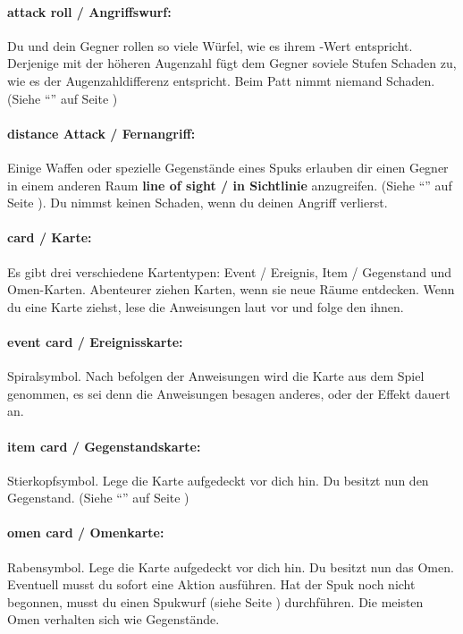 \paragraph{attack roll / Angriffswurf:} Du und dein Gegner rollen so viele Würfel, wie es ihrem \might-Wert entspricht. Derjenige mit der höheren Augenzahl fügt dem Gegner soviele Stufen Schaden zu, wie es der Augenzahldifferenz entspricht. Beim Patt nimmt niemand Schaden. (Siehe ``'' auf Seite \pageref{kap:rule:attack})

\paragraph{distance Attack / Fernangriff:} Einige Waffen oder spezielle Gegenstände eines Spuks erlauben dir einen Gegner in einem anderen Raum \textbf{line of sight / in Sichtlinie} anzugreifen. (Siehe ``'' auf Seite \pageref{kap:rule:specialattack}). Du nimmst keinen Schaden, wenn du deinen Angriff verlierst.

\paragraph{card / Karte:} Es gibt drei verschiedene Kartentypen: Event / Ereignis, Item / Gegenstand und Omen-Karten. Abenteurer ziehen Karten, wenn sie neue Räume entdecken. Wenn du eine Karte ziehst, lese die Anweisungen laut vor und folge den ihnen.

\paragraph{event card / Ereignisskarte:} Spiralsymbol. Nach befolgen der Anweisungen wird die Karte aus dem Spiel genommen, es sei denn die Anweisungen besagen anderes, oder der Effekt dauert an.

\paragraph{item card / Gegenstandskarte:} Stierkopfsymbol. Lege die Karte aufgedeckt vor dich hin. Du besitzt nun den Gegenstand.
(Siehe ``'' auf Seite \pageref{kap:rule:useitemomen})

\paragraph{omen card / Omenkarte:} Rabensymbol. Lege die Karte aufgedeckt vor dich hin. Du besitzt nun das Omen. Eventuell musst du sofort eine Aktion ausführen. Hat der Spuk noch nicht begonnen, musst du einen Spukwurf (siehe Seite \pageref{kap:rule:makehauntroll}) durchführen. Die meisten Omen verhalten sich wie Gegenstände.

